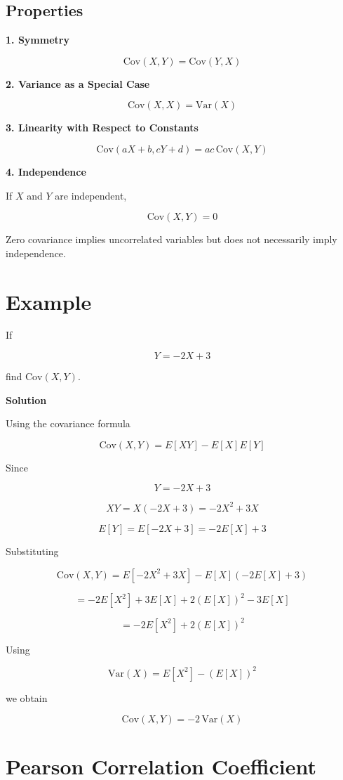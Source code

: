 \documentclass[12pt]{article}
\begin{document}
\subsection{Properties}

\textbf{1. Symmetry}

\[
\text{Cov}(X,Y) = \text{Cov}(Y,X)
\]

\textbf{2. Variance as a Special Case}

\[
\text{Cov}(X,X) = \text{Var}(X)
\]

\textbf{3. Linearity with Respect to Constants}

\[
\text{Cov}(aX+b,cY+d) = ac \, \text{Cov}(X,Y)
\]

\textbf{4. Independence}

If $X$ and $Y$ are independent,

\[
\text{Cov}(X,Y) = 0
\]

Zero covariance implies uncorrelated variables but does not necessarily imply independence.

\section{Example}

If

\[
Y = -2X + 3
\]

find $\text{Cov}(X,Y)$.

\textbf{Solution}

Using the covariance formula

\[
\text{Cov}(X,Y) = E[XY] - E[X]E[Y]
\]

Since

\[
Y = -2X + 3
\]

\[
XY = X(-2X+3) = -2X^2 + 3X
\]

\[
E[Y] = E[-2X+3] = -2E[X] + 3
\]

Substituting

\[
\text{Cov}(X,Y)
= E[-2X^2 + 3X] - E[X](-2E[X]+3)
\]

\[
= -2E[X^2] + 3E[X] + 2(E[X])^2 - 3E[X]
\]

\[
= -2E[X^2] + 2(E[X])^2
\]

Using

\[
\text{Var}(X) = E[X^2] - (E[X])^2
\]

we obtain

\[
\boxed{\text{Cov}(X,Y) = -2 \, \text{Var}(X)}
\]

\section{Pearson Correlation Coefficient}
\end{document}
